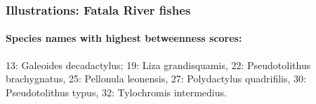 \subsubsection{Illustrations: Fatala River fishes}
\label{names_Baran}
\paragraph{Species names with highest betweenness scores:}
  13: Galeoides decadactylus; 19: Liza grandisquamis, 22:  Pseudotolithus brachygnatus, 25: Pellonula leonensis, 27:  Polydactylus quadrifilis, 30: Pseudotolithus typus, 32: Tylochromis intermedius.

